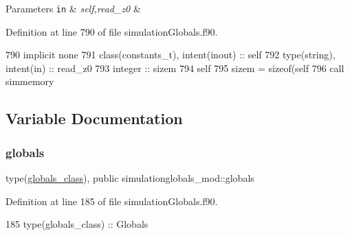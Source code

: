 \begin{DoxyParams}[1]{Parameters}
\mbox{\tt in}  & {\em self,read\+\_\+z0} & \\
\hline
\end{DoxyParams}


Definition at line 790 of file simulation\+Globals.\+f90.


\begin{DoxyCode}
790     \textcolor{keywordtype}{implicit none}
791     \textcolor{keywordtype}{class}(constants\_t), \textcolor{keywordtype}{intent(inout)} :: self
792     \textcolor{keywordtype}{type}(string), \textcolor{keywordtype}{intent(in)} :: read\_z0
793     \textcolor{keywordtype}{integer} :: sizem
794     self%
795     sizem = sizeof(self%
796     \textcolor{keyword}{call }simmemory%
\end{DoxyCode}


\subsection{Variable Documentation}
\mbox{\label{namespacesimulationglobals__mod_acf1e2786d81bd0fe337a8458efce8733}} 
\subsubsection{\texorpdfstring{globals}{globals}}
{\footnotesize\ttfamily type(\mbox{\hyperlink{structsimulationglobals__mod_1_1globals__class}{globals\+\_\+class}}), public simulationglobals\+\_\+mod\+::globals}



Definition at line 185 of file simulation\+Globals.\+f90.


\begin{DoxyCode}
185     \textcolor{keywordtype}{type}(globals\_class) :: Globals
\end{DoxyCode}
